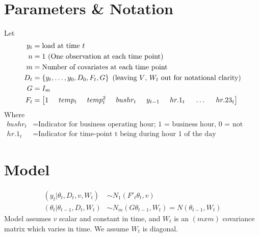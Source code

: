 \documentclass{article}
\title{
\vspace{2in}
\textmd{\textbf{\hmwkTitle}}\\
\normalsize\vspace{0.1in}\small{\hmwkDueDate}\\
\vspace{0.1in}\large{\textit{\hmwkClassInstructor\ }}
\vspace{3in}
}
\author{\textbf{\hmwkAuthorName}}
\date{} %
\begin{document}

%

\newpage
\section{Parameters \& Notation}
Let
\begin{align*}
	y_t &= \text{load at time }t \\
	n &= 1 \text{ (One observation at each time point)}\\
	m &= \text{Number of covariates at each time point}\\
	D_t &= \left\{y_t,\hdots,y_0,D_0,F_t,G \right\} \text{ (leaving $V$, $W_t$ out for notational clarity)}\\
	G &= I_m \\
	F_t &= \left[1 \hspace{.5cm} temp_t \hspace{.5cm} temp_t^2 \hspace{.5cm} bushr_t \hspace{.5cm}
		 y_{t-1} \hspace{.5cm} hr.1_t \hspace{.5cm} \hdots \hspace{.5cm} hr.23_t \right]
\end{align*}
Where
\begin{align*}
	bushr_t &= \text{Indicator for business operating hour; 1 = business hour, 0 = not business hour}\\
	hr.1_t &= \text{Indicator for time-point t being during hour 1 of the day} 
\end{align*}

\section{Model}
\begin{align*}
	(y_t | \theta_t, D_t,v,W_t) &\sim N_1\left(F'_t\theta_t, v \right)\\
	(\theta_t | \theta_{t-1},D_t,W_t) &\sim N_m\left(G\theta_{t-1},W_t \right) = N\left(\theta_{t-1},W_t \right)
\end{align*}
Model assumes $v$ scalar and constant in time, and $W_t$ is an $(mxm)$ covariance matrix which varies in time.
We assume $W_t$ is diagonal.
\end{document}
